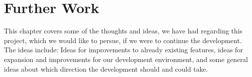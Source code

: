 
\chapter{Further Work}
\label{cha:further_work}

This chapter covers some of the thoughts and ideas, we have had regarding this project, which we would like to persue, if we were to continue the development. The ideas include: Ideas for improvements to already existing features, ideas for expansion and improvements for our development environment, and some general ideas about which direction the development should and could take. 

















